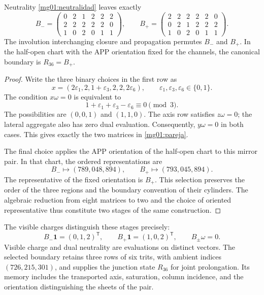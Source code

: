 \begin{proposition}
\label{mg01:dos-orientacion}
Neutrality \eqref{mg01:neutralidad} leaves exactly
\begin{equation}
 B_-=
 \begin{pmatrix}0&2&1&2&2&2\\2&2&2&2&2&0\\1&0&2&0&1&1\end{pmatrix},
 \qquad
 B_+=
 \begin{pmatrix}2&2&2&2&2&0\\0&2&1&2&2&2\\1&0&2&0&1&1\end{pmatrix}.
 \label{mg01:pareja}
\end{equation}
The involution interchanging closure and propagation permutes \(B_-\)
and \(B_+\). In the half-open chart with the APP orientation fixed
for the channels, the canonical boundary is \(R_{36}=B_+\).
\end{proposition}
\begin{proof}
Write the three binary choices in the first row as
\[
 x=(2\varepsilon_1,2,1+\varepsilon_3,2,2,2\varepsilon_6),
 \qquad \varepsilon_1,\varepsilon_3,\varepsilon_6\in\{0,1\}.
\]
The condition \(x\omega=0\) is equivalent to
\[
 1+\varepsilon_1+\varepsilon_3-\varepsilon_6\equiv0\pmod3.
\]
The possibilities are \((0,0,1)\) and \((1,1,0)\). The axis row
satisfies \(z\omega=0\); the lateral aggregate also has zero dual
evaluation. Consequently, \(y\omega=0\) in both cases. This gives
exactly the two matrices in \eqref{mg01:pareja}.

The final choice applies the APP orientation of the half-open chart
to this mirror pair. In that chart, the ordered representations are
\[
 B_-\longmapsto(789,048,894),\qquad
 B_+\longmapsto(793,045,894).
\]
The representative of the fixed orientation is \(B_+\). This selection
preserves the order of the three regions and the boundary convention
of their cylinders. The algebraic reduction from eight matrices to two
and the choice of oriented representative thus constitute two stages
of the same construction.
\end{proof}

The visible charges distinguish these stages precisely:
\begin{equation}
 B_-\mathbf1=(0,1,2)^{\mathsf T},\qquad
 B_+\mathbf1=(1,0,2)^{\mathsf T},\qquad
 B_\pm\omega=0.
 \label{mg01:cargas}
\end{equation}
Visible charge and dual neutrality are evaluations on distinct vectors.
The selected boundary retains three rows of six trits, with ambient
indices \((726,215,301)\), and supplies the junction state \(R_{36}\)
for joint prolongation. Its memory includes the transported axis,
saturation, column incidence, and the orientation distinguishing the
sheets of the pair.

